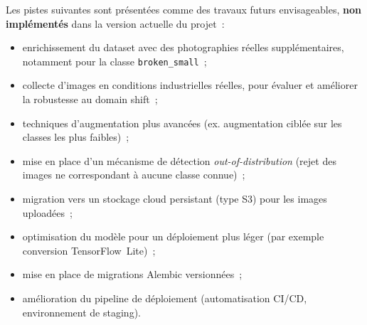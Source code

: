 Les pistes suivantes sont pr\'esent\'ees comme des travaux futurs envisageables, \textbf{non impl\'ement\'es} dans la version actuelle du projet~:
\begin{itemize}
  \item enrichissement du dataset avec des photographies r\'eelles suppl\'ementaires, notamment pour la classe \texttt{broken\_small}~;
  \item collecte d'images en conditions industrielles r\'eelles, pour \'evaluer et am\'eliorer la robustesse au domain shift~;
  \item techniques d'augmentation plus avanc\'ees (ex. augmentation cibl\'ee sur les classes les plus faibles)~;
  \item mise en place d'un m\'ecanisme de d\'etection \emph{out-of-distribution} (rejet des images ne correspondant \`a aucune classe connue)~;
  \item migration vers un stockage cloud persistant (type S3) pour les images upload\'ees~;
  \item optimisation du mod\`ele pour un d\'eploiement plus l\'eger (par exemple conversion TensorFlow~Lite)~;
  \item mise en place de migrations Alembic versionn\'ees~;
  \item am\'elioration du pipeline de d\'eploiement (automatisation CI/CD, environnement de staging).
\end{itemize}
